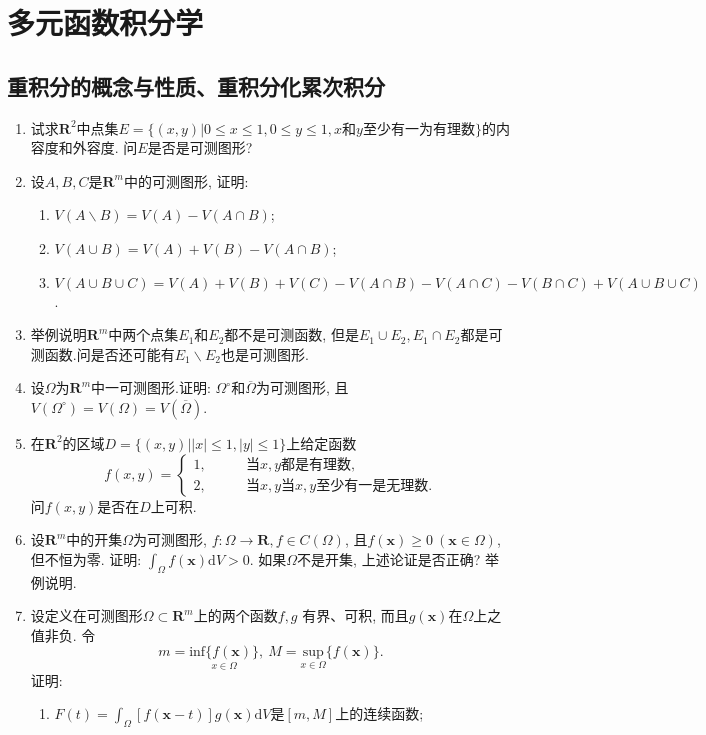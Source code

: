 \chapter{多元函数积分学}
\section{重积分的概念与性质、重积分化累次积分}
\begin{enumerate}
	\item 试求$\bm{R}^2$中点集$E=\{(x,y)|0\le x\le1,0\le y\le 1, x\text{和}y\text{至少有一为有理数}\}$的内容度和外容度. 问$E$是否是可测图形?
	\item 设$A,B,C$是$\bm{R}^m$中的可测图形, 证明:
	\begin{enumerate}
		\item $V(A\backslash B)=V(A)-V(A\cap B)$;
		\item $V(A\cup B)=V(A)+V(B)-V(A\cap B)$;
		\item $V(A\cup B\cup C)=V(A)+V(B)+V(C)-V(A\cap B)-V(A\cap C)-V(B\cap C)+V(A\cup B\cup C)$.
	\end{enumerate}
\item 举例说明$\bm{R}^m$中两个点集$E_1$和$E_2$都不是可测函数, 但是$E_1\cup E_2, E_1\cap E_2$都是可测函数.问是否还可能有$E_1\backslash E_2$也是可测图形.
\item 设$\Omega$为$\bm{R}^m$中一可测图形.证明: $\Omega^\circ$和$\overline{\Omega}$为可测图形, 且$V(\Omega^\circ)=V(\Omega)=V(\overline{\Omega})$.
\item 在$\bm{R}^2$的区域$D=\{(x,y)||x|\le 1,|y|\le 1\}$上给定函数
$$ f(x,y)=\begin{cases}
1,\qquad & \text{当}x,y\text{都是有理数}, \\
2,\qquad & \text{当}x,y\text{当}x,y\text{至少有一是无理数}.
\end{cases}$$
问$f(x,y)$是否在$D$上可积.
\item 设$\bm{R}^m$中的开集$\Omega$为可测图形, $f:\Omega\rightarrow \bm{R},f\in C(\Omega)$, 且$f(\bm{x})\ge 0\ (\bm{x}\in \Omega)$, 但不恒为零. 证明: $\displaystyle{\int_{\Omega}f(\bm{x})\mathrm{d}V}>0$. 如果$\Omega$不是开集, 上述论证是否正确? 举例说明.
\item 设定义在可测图形$\Omega \subset \bm{R}^m$上的两个函数$f,g$ 有界、可积, 而且$g(\bm{x})$在$\Omega$上之值非负. 令$$
m=\underset{x\in \Omega}{\mathrm{inf}\{f(\bm{x})\}},\ M = \underset{x\in \Omega}{\mathrm{sup}}\{f(\bm{x})\}.$$
证明:
\begin{enumerate}
	\item $F(t)=\displaystyle{\int_{\Omega}[f(\bm{x}-t)]g(\bm{x})\mathrm{d}V}$是$[m,M]$上的连续函数;

\end{enumerate}
\end{enumerate}
